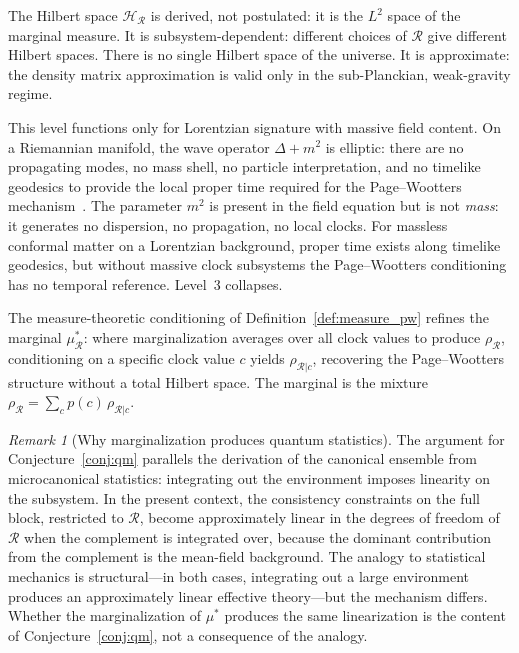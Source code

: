 \documentclass[12pt,a4paper]{article}
\theoremstyle{definition}
\theoremstyle{remark}
\newtheorem{remark}{Remark}
\begin{document}
The Hilbert space $\mathcal{H}_\mathcal{R}$ is derived, not
postulated: it is the $L^2$ space of the marginal measure.
It is subsystem-dependent: different choices of $\mathcal{R}$ give
different Hilbert spaces. There is no single Hilbert space of the
universe. It is approximate: the density matrix approximation is valid
only in the sub-Planckian, weak-gravity regime.

This level functions only for Lorentzian signature with massive field
content. On a Riemannian manifold, the wave operator $\Delta + m^2$ is
elliptic: there are no propagating modes, no mass shell, no particle
interpretation, and no timelike geodesics to provide the local proper
time required for the Page--Wootters mechanism~\cite{page_wootters}. The
parameter $m^2$ is present in the field equation but is not
\emph{mass}: it generates no dispersion, no propagation, no local
clocks. For massless conformal matter on a Lorentzian background, proper
time exists along timelike geodesics, but without massive clock
subsystems the Page--Wootters conditioning has no temporal reference.
Level~3 collapses.

The measure-theoretic conditioning of Definition~\ref{def:measure_pw}
refines the marginal $\mu^*_\mathcal{R}$: where marginalization averages
over all clock values to produce $\rho_\mathcal{R}$, conditioning on a
specific clock value $c$ yields $\rho_{\mathcal{R}|c}$, recovering the
Page--Wootters structure without a total Hilbert space. The marginal is the
mixture $\rho_\mathcal{R} = \sum_c p(c)\,\rho_{\mathcal{R}|c}$.

\begin{remark}[Why marginalization produces quantum statistics]
The argument for Conjecture~\ref{conj:qm} parallels the derivation of the
canonical ensemble from microcanonical statistics: integrating out the
environment imposes linearity on the subsystem. In the present context,
the consistency constraints on the full block, restricted to
$\mathcal{R}$, become approximately linear in the degrees of freedom of
$\mathcal{R}$ when the complement is integrated over, because the
dominant contribution from the complement is the mean-field background.
The analogy to statistical mechanics is structural---in both cases,
integrating out a large environment produces an approximately linear
effective theory---but the mechanism differs. Whether the marginalization
of $\mu^*$ produces the same linearization is the content of
Conjecture~\ref{conj:qm}, not a consequence of the analogy.
\end{remark}
\end{document}
